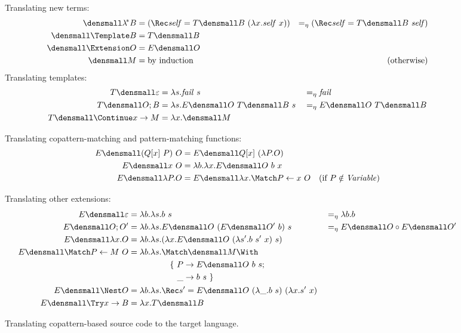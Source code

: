 \begin{figure}[t]
\centering
Translating new terms:  
\begin{align*}
  \den{\lamstar B}
  &=
  (\Rec \mathit{self} = T\den{B} ~ (\lambda x. \mathit{self} ~ x))
  &=_\eta
  (\Rec \mathit{self} = T\den{B} ~ \mathit{self})
  \\
  \den{\Template B}
  &=
  T\den{B}
  \\
  \den{\Extension O}
  &=
  E\den{O}
  \\
  \den{M}
  &=
  \text{by induction}
  &(\text{otherwise})
\end{align*}
Translating templates:
\begin{align*}
  T\den{\varepsilon}
  &=
  \lambda s. \mathit{fail}~s
  &
  &=_\eta
  \mathit{fail}
  \\
  T\den{O; B}
  &=
  \lambda s. E\den{O} ~ T\den{B} ~ s
  &
  &=_\eta
  E\den{O} ~ T\den{B}
  \\
  T\den{\Continue x \to M}
  &=
  \lambda x. \den{M}
\end{align*}

Translating copattern-matching and pattern-matching functions:
\begin{align*}
  E\den{(Q[x] ~ P) ~ O}
  &=
  E\den{Q[x] ~ (\lambda P. O)}
  \\
  E\den{x ~ O}
  &=
  \lambda b. \lambda x. E\den{O} ~ b ~ x
  \\
  E\den{\lambda P. O}
  &=
  E\den{\lambda x. \Match P \gets x ~ O}
  &(\text{if } P \notin \mathit{Variable})
\end{align*}

Translating other extensions:
\begin{align*}
  E\den{\varepsilon}
  &=
  \lambda b. \lambda s. b ~ s
  &
  &=_\eta
  \lambda b. b
  \\
  E\den{O; O'}
  &=
  \lambda b. \lambda s. E\den{O} ~ (E\den{O'}~b) ~ s
  &
  &=_\eta
  E\den{O} \comp E\den{O'}
  \\
  E\den{\lambda x. O}
  &=
  \lambda b. \lambda s. (\lambda x. E\den{O} ~ (\lambda s'. b ~ s' ~ x) ~ s)
  \\
  E\den{\Match P \gets M ~ O}
  &=
  \lambda b. \lambda s.
  \begin{aligned}[t]
    &\Match \den{M} \With \\
    &\quad
    \begin{aligned}[t]
      \{~
      P &\to E\den{O}~b~s; \\
      \_ &\to b~s
      ~\}
    \end{aligned}
  \end{aligned}
  \\
  E\den{\Nest O}
  &=
  \lambda b. \lambda s. \Rec s' = E\den{O} ~ (\lambda \_. b ~ s) ~ (\lambda x. s' ~ x)
  \\
  E\den{\Try x \to B}
  &=
  \lambda x. T\den{B}
\end{align*}
\caption{Translating copattern-based source code to the target language.}
\label{fig:translation}
\end{figure}

